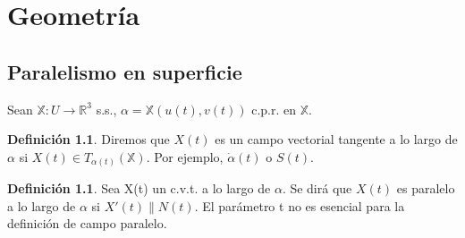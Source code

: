 \documentclass[twoside]{report}
\theoremstyle{definition}
\newtheorem{defi}[theorem]{Definición}
\numberwithin{equation}{section}
\newcommand{\R}{\mathbb{R}}
\newcommand{\X}{\mathbb{X}}
\begin{document}
\chapter{Geometría}
\section{Paralelismo en superficie}
Sean $\X:U\to\R^3$ s.s., $\alpha=\X(u(t),v(t))$ c.p.r. en $\X$.

\begin{defi}
Diremos que $X(t)$ es un campo vectorial tangente a lo largo de $\alpha$ si $X(t) \in T_{\alpha(t)}(\X)$. Por ejemplo, $\dot{\alpha}(t)$ o $S(t)$.
\end{defi}

\begin{defi}
Sea X(t) un c.v.t. a lo largo de $\alpha$. Se dirá que $X(t)$ es paralelo a lo largo de $\alpha$ si $X'(t) \parallel N(t)$. El parámetro t no es esencial para la definición de campo paralelo.
\end{defi}
\end{document}
